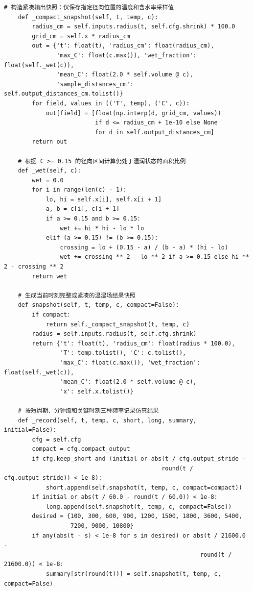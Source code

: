 \begin{Verbatim}[fontsize=\scriptsize,breaklines=true,breakanywhere=true]
    # 构造紧凑输出快照：仅保存指定径向位置的温度和含水率采样值
    def _compact_snapshot(self, t, temp, c):
        radius_cm = self.inputs.radius(t, self.cfg.shrink) * 100.0
        grid_cm = self.x * radius_cm
        out = {'t': float(t), 'radius_cm': float(radius_cm),
               'max_C': float(c.max()), 'wet_fraction': float(self._wet(c)),
               'mean_C': float(2.0 * self.volume @ c),
               'sample_distances_cm': self.output_distances_cm.tolist()}
        for field, values in (('T', temp), ('C', c)):
            out[field] = [float(np.interp(d, grid_cm, values))
                          if d <= radius_cm + 1e-10 else None
                          for d in self.output_distances_cm]
        return out

    # 根据 C >= 0.15 的径向区间计算仍处于湿润状态的面积比例
    def _wet(self, c):
        wet = 0.0
        for i in range(len(c) - 1):
            lo, hi = self.x[i], self.x[i + 1]
            a, b = c[i], c[i + 1]
            if a >= 0.15 and b >= 0.15:
                wet += hi * hi - lo * lo
            elif (a >= 0.15) != (b >= 0.15):
                crossing = lo + (0.15 - a) / (b - a) * (hi - lo)
                wet += crossing ** 2 - lo ** 2 if a >= 0.15 else hi ** 2 - crossing ** 2
        return wet

    # 生成当前时刻完整或紧凑的温湿场结果快照
    def snapshot(self, t, temp, c, compact=False):
        if compact:
            return self._compact_snapshot(t, temp, c)
        radius = self.inputs.radius(t, self.cfg.shrink)
        return {'t': float(t), 'radius_cm': float(radius * 100.0),
                'T': temp.tolist(), 'C': c.tolist(),
                'max_C': float(c.max()), 'wet_fraction': float(self._wet(c)),
                'mean_C': float(2.0 * self.volume @ c),
                'x': self.x.tolist()}

    # 按短周期、分钟级和关键时刻三种频率记录仿真结果
    def _record(self, t, temp, c, short, long, summary, initial=False):
        cfg = self.cfg
        compact = cfg.compact_output
        if cfg.keep_short and (initial or abs(t / cfg.output_stride -
                                             round(t / cfg.output_stride)) < 1e-8):
            short.append(self.snapshot(t, temp, c, compact=compact))
        if initial or abs(t / 60.0 - round(t / 60.0)) < 1e-8:
            long.append(self.snapshot(t, temp, c, compact=False))
        desired = {100, 300, 600, 900, 1200, 1500, 1800, 3600, 5400,
                   7200, 9000, 10800}
        if any(abs(t - s) < 1e-8 for s in desired) or abs(t / 21600.0 -
                                                        round(t / 21600.0)) < 1e-8:
            summary[str(round(t))] = self.snapshot(t, temp, c, compact=False)



\end{Verbatim}
